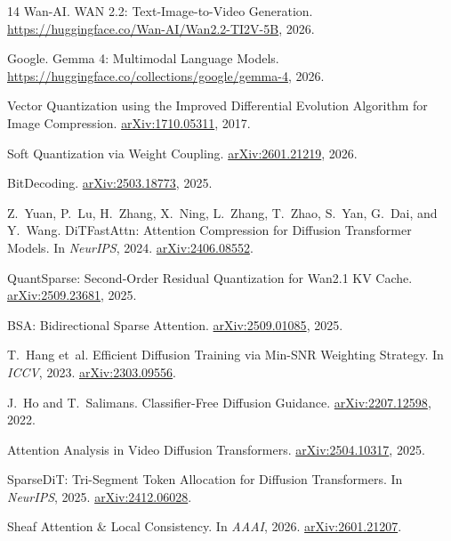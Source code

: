 \documentclass[11pt,a4paper]{article}
\begin{document}
\begin{thebibliography}{14}
Wan-AI.
\newblock WAN 2.2: Text-Image-to-Video Generation.
\newblock \url{https://huggingface.co/Wan-AI/Wan2.2-TI2V-5B}, 2026.

Google.
\newblock Gemma 4: Multimodal Language Models.
\newblock \url{https://huggingface.co/collections/google/gemma-4}, 2026.

Vector Quantization using the Improved Differential Evolution Algorithm for Image Compression.
\newblock \href{https://arxiv.org/abs/1710.05311}{arXiv:1710.05311}, 2017.

Soft Quantization via Weight Coupling.
\newblock \href{https://arxiv.org/abs/2601.21219}{arXiv:2601.21219}, 2026.

BitDecoding.
\newblock \href{https://arxiv.org/abs/2503.18773}{arXiv:2503.18773}, 2025.

Z.~Yuan, P.~Lu, H.~Zhang, X.~Ning, L.~Zhang, T.~Zhao, S.~Yan, G.~Dai, and Y.~Wang.
\newblock DiTFastAttn: Attention Compression for Diffusion Transformer Models.
\newblock In \emph{NeurIPS}, 2024.
\newblock \href{https://arxiv.org/abs/2406.08552}{arXiv:2406.08552}.

QuantSparse: Second-Order Residual Quantization for Wan2.1 KV Cache.
\newblock \href{https://arxiv.org/abs/2509.23681}{arXiv:2509.23681}, 2025.

BSA: Bidirectional Sparse Attention.
\newblock \href{https://arxiv.org/abs/2509.01085}{arXiv:2509.01085}, 2025.

T.~Hang et~al.
\newblock Efficient Diffusion Training via Min-SNR Weighting Strategy.
\newblock In \emph{ICCV}, 2023.
\newblock \href{https://arxiv.org/abs/2303.09556}{arXiv:2303.09556}.

J.~Ho and T.~Salimans.
\newblock Classifier-Free Diffusion Guidance.
\newblock \href{https://arxiv.org/abs/2207.12598}{arXiv:2207.12598}, 2022.

Attention Analysis in Video Diffusion Transformers.
\newblock \href{https://arxiv.org/abs/2504.10317}{arXiv:2504.10317}, 2025.

SparseDiT: Tri-Segment Token Allocation for Diffusion Transformers.
\newblock In \emph{NeurIPS}, 2025.
\newblock \href{https://arxiv.org/abs/2412.06028}{arXiv:2412.06028}.

Sheaf Attention \& Local Consistency.
\newblock In \emph{AAAI}, 2026.
\newblock \href{https://arxiv.org/abs/2601.21207}{arXiv:2601.21207}.


\end{thebibliography}
\end{document}
